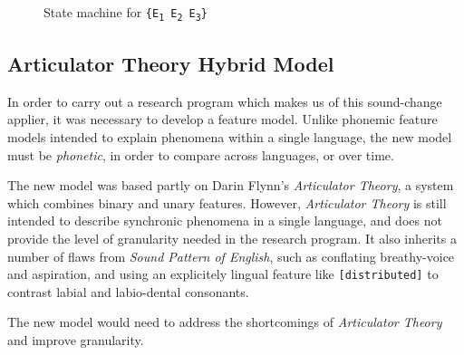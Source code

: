 \documentclass[10pt,letterpaper]{article}
\begin{document}
%
%
%

\begin{figure}\label{fig:machine_set}
\caption{State machine for \texttt{\{E\textsubscript{1} E\textsubscript{2} E\textsubscript{3}\}}}
\centering
{}
\end{figure}

\subsection{Articulator Theory Hybrid Model}
\label{sub:ATHM}
In order to carry out a research program which makes us of this sound-change applier, it was necessary to develop a feature model. Unlike phonemic feature models intended to explain phenomena within a single language, the new model must be \emph{phonetic}, in order to compare across languages, or over time.

The new model was based partly on Darin Flynn's \emph{Articulator Theory}, a system which combines binary and unary features. However, \emph{Articulator Theory} is still intended to describe synchronic phenomena in a single language, and does not provide the level of granularity needed in the research program. It also inherits a number of flaws from \emph{Sound Pattern of English}, such as conflating breathy-voice and aspiration, and using an explicitely lingual feature like \texttt{[distributed]} to contrast labial and labio-dental consonants.

The new model would need to address the shortcomings of \emph{Articulator Theory} and improve granularity.
\end{document}
